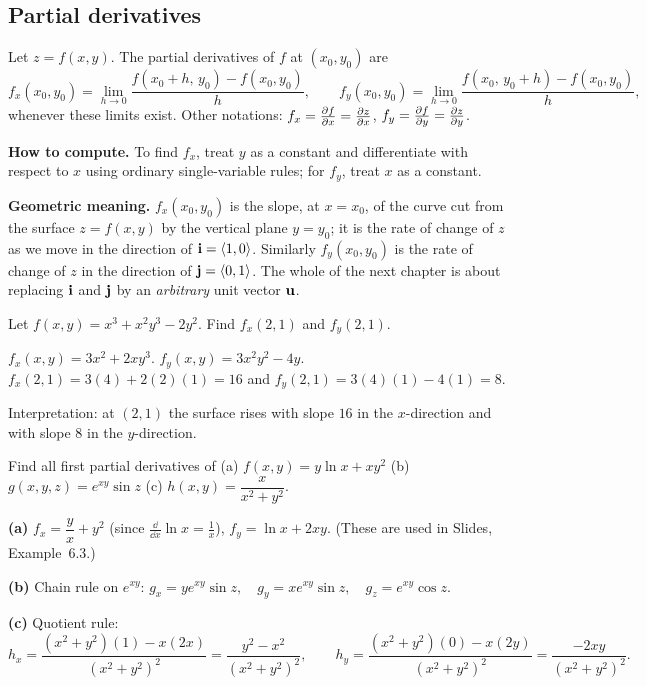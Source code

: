 \subsection{Partial derivatives}

\begin{definition}\label{def:partials}
Let $z=f(x,y)$. The partial derivatives of $f$ at $(x_0,y_0)$ are
\[
  f_x(x_0,y_0)=\lim_{h\to0}\frac{f(x_0+h,\,y_0)-f(x_0,y_0)}{h},\qquad
  f_y(x_0,y_0)=\lim_{h\to0}\frac{f(x_0,\,y_0+h)-f(x_0,y_0)}{h},
\]
whenever these limits exist. Other notations: $f_x=\frac{\partial f}{\partial x}=\frac{\partial z}{\partial x}$,
$f_y=\frac{\partial f}{\partial y}=\frac{\partial z}{\partial y}$.
\end{definition}

\textbf{How to compute.} To find $f_x$, treat $y$ as a constant and
differentiate with respect to $x$ using ordinary single-variable rules; for
$f_y$, treat $x$ as a constant.

\textbf{Geometric meaning.} $f_x(x_0,y_0)$ is the slope, at $x=x_0$, of the
curve cut from the surface $z=f(x,y)$ by the vertical plane $y=y_0$; it is the
rate of change of $z$ as we move in the direction of $\mathbf{i}=\left\langle 1,0 \right\rangle$.
Similarly $f_y(x_0,y_0)$ is the rate of change of $z$ in the direction of
$\mathbf{j}=\left\langle 0,1 \right\rangle$. The whole of the next chapter is about replacing $\mathbf{i}$ and
$\mathbf{j}$ by an \emph{arbitrary} unit vector $\mathbf{u}$.

\begin{example}\label{ex:partials}
Let $f(x,y)=x^3+x^2y^3-2y^2$. Find $f_x(2,1)$ and $f_y(2,1)$.
\end{example}
\begin{solution}
 $f_x(x,y)=3x^2+2xy^3$.
 $f_y(x,y)=3x^2y^2-4y$.
$f_x(2,1)=3(4)+2(2)(1)=16$ and $f_y(2,1)=3(4)(1)-4(1)=8$.

Interpretation: at $(2,1)$ the surface rises with slope $16$ in the
$x$-direction and with slope $8$ in the $y$-direction.
\end{solution}

\begin{example}\label{ex:partials2}
Find all first partial derivatives of
(a) $f(x,y)=y\ln x+xy^2$ \quad (b) $g(x,y,z)=e^{xy}\sin z$ \quad
(c) $h(x,y)=\dfrac{x}{x^2+y^2}$.
\end{example}
\begin{solution}
\textbf{(a)} $f_x=\dfrac{y}{x}+y^2$ (since $\frac{\dd}{\dd x}\ln x=\frac1x$),
\quad $f_y=\ln x+2xy$. (These are used in Slides, Example~6.3.)

\textbf{(b)} Chain rule on $e^{xy}$:
$g_x=ye^{xy}\sin z,\quad g_y=xe^{xy}\sin z,\quad g_z=e^{xy}\cos z.$

\textbf{(c)} Quotient rule:
\[
h_x=\frac{(x^2+y^2)(1)-x(2x)}{(x^2+y^2)^2}=\frac{y^2-x^2}{(x^2+y^2)^2},\qquad
h_y=\frac{(x^2+y^2)(0)-x(2y)}{(x^2+y^2)^2}=\frac{-2xy}{(x^2+y^2)^2}.
\]
\end{solution}

